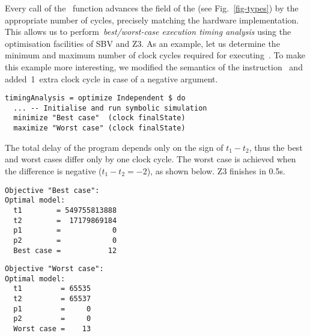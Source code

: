 Every call of the~ function advances the  field
of the  (see Fig.~\ref{fig-types}) by the appropriate number of
cycles, precisely matching the hardware implementation. This allows us to
perform~\emph{best/worst-case execution timing analysis} using the
optimisation facilities of SBV and Z3. As an example,
let us determine the minimum and maximum number of clock cycles required for
executing~. To make this example more
interesting, we modified the semantics of the instruction~ and
added~1~extra clock cycle in case of a negative argument.


\begin{verbatim}
timingAnalysis = optimize Independent $ do
  ... -- Initialise and run symbolic simulation
  minimize "Best case"  (clock finalState)
  maximize "Worst case" (clock finalState)
\end{verbatim}

\noindent
The total delay of the program depends only on the sign of $t_1 - t_2$, thus
the best and worst cases differ only by one clock cycle. The worst case is
achieved when the difference is negative ($t_1 - t_2 = -2$), as shown below.
Z3 finishes in 0.5s.

\noindent
\begin{minipage}{0.53\linewidth}
\begin{verbatim}
Objective "Best case":
Optimal model:
  t1        = 549755813888
  t2        =  17179869184
  p1        =            0
  p2        =            0
  Best case =           12
\end{verbatim}
\end{minipage}
\begin{minipage}{0.46\linewidth}
\begin{verbatim}
Objective "Worst case":
Optimal model:
  t1         = 65535
  t2         = 65537
  p1         =     0
  p2         =     0
  Worst case =    13
\end{verbatim}
\end{minipage}